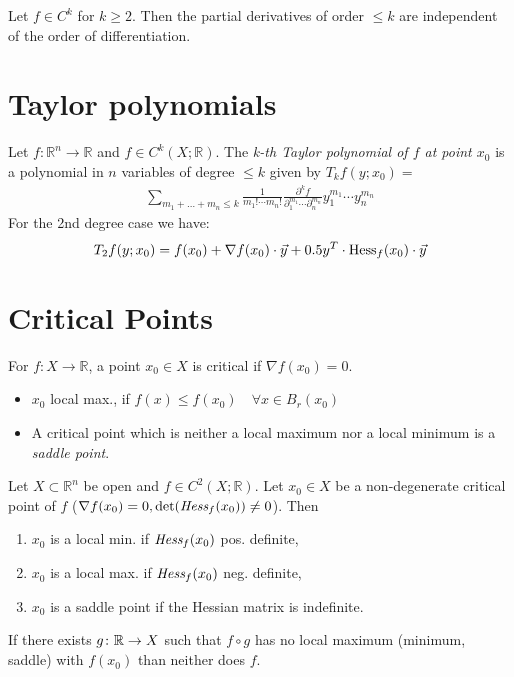  Let $f \in C^k$ for $k\geq 2$. Then the partial derivatives of order $\leq k$ are independent of the order of differentiation.


\section{Taylor polynomials}

 Let $f\colon \mathbb{R}^n \to \mathbb{R}$ and $f\in C^k(X;\mathbb{R})$. The \textit{k-th Taylor polynomial of $f$ at point $x_0$} is a polynomial in $n$ variables of degree $\le k$ given by $T_kf(y;x_0) =$
\begin{align*}
\sum_{{m_1 + \ldots + m_n \leq k}}\frac{1}{m_1!\cdots m_n!}\frac{\partial^k f}{\partial_{1}^{m_1}\cdots \partial_{n}^{m_n}} y_1^{m_1}\cdots y_n^{m_n}
\end{align*}
For the 2nd degree case we have:
$$T_2f(y;x_0) = f(x_0) + \nabla f (x_0) \cdot \vec{y} + 0.5y^T \cdot \text{Hess}_f(x_0) \cdot \vec{y} $$

\section{Critical Points} 

 For $f\colon X\to \mathbb{R}$, a point $x_0\in X$ is critical if $\nabla f(x_0) = 0$. 
\begin{itemize}
	\item $x_0$ local max., if $f(x) \le f(x_0) \quad \forall x\in B_r(x_0)$
	\item A critical point which is neither a local maximum nor a local minimum is a \textit{saddle point}.
\end{itemize}

Let $X\subset\mathbb{R}^n$ be open and $f\in C^2(X ;\mathbb{R})$. Let $x_0 \in X$ be a non-degenerate critical point of $f$ ($\nabla f(x_0) = 0, \det(\emph{Hess}_f(x_0))\neq 0$). Then 
\begin{enumerate}
    \item $x_0$ is a local min. if $\emph{Hess}_f(x_0)$ pos. definite,
    
    \item $x_0$ is a local max. if $\emph{Hess}_f(x_0)$ neg. definite,
    
    \item $x_0$ is a saddle point if the Hessian matrix is indefinite.
\end{enumerate}

If there exists $g\colon \mathbb{R} \to X$ such that $f \circ g$ has no local maximum (minimum, saddle) with $f(x_0)$ than neither does $f$.



